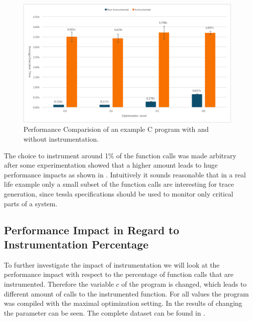 \begin{figure}
  \includegraphics[width=\textwidth]{gfx/instrumentation_time_benchmark}
  \caption{Performance Comparision of an example C program with and without instrumentation.}
\label{fig:chap_eval:instrument_benchmark_results}
\end{figure}

The choice to instrument around 1\% of the function calls was made arbitrary after some experimentation showed that a higher amount leads to huge performance impacts as shown in .
Intuitively it sounds reasonable that in a real life example only a small subset of the function calls are interesting for trace generation, since \gls{tessla} specifications should be used to monitor only critical parts of a system.

\subsection{Performance Impact in Regard to Instrumentation Percentage}
\label{sec:evaluation:instrumentation_benchmark:instr_amount}

To further investigate the impact of instrumentation we will look at the performance impact with respect to the percentage of function calls that are instrumented.
Therefore the variable \(c\) of the program is changed, which leads to different amount of calls to the instrumented function.
For all values the program was compiled with the maximal optimization setting.
In  the results of changing the parameter can be seen.
The complete dataset can be found in .

